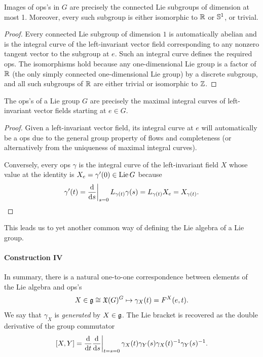 \begin{prop}
    Images of \gls{ops}'s in $G$ are precisely the connected Lie subgroups of dimension at most 1. Moreover, every such subgroup is either isomorphic to $\mathbb{R}$ or $\mathbb{S}^1$, or trivial.
\end{prop}
\begin{proof}
    Every connected Lie subgroup of dimension $1$ is automatically abelian and is the integral curve of the left-invariant vector field corresponding to any nonzero tangent vector to the subgroup at $e$. Such an integral curve defines the required \gls{ops}. The isomorphisms hold because any one-dimensional Lie group is a factor of $\mathbb{R}$ (the only simply connected one-dimensional Lie group) by a discrete subgroup, and all such subgroups of $\mathbb{R}$ are either trivial or isomorphic to $\mathbb{Z}$.
\end{proof}


\begin{thm}
    The \gls{ops}'s of a Lie group $G$ are precisely the maximal integral curves of left-invariant vector fields starting at $e\in G$.
\end{thm}
\begin{proof}
    Given a left-invariant vector field, its integral curve at $e$ will automatically be a \gls{ops} due to the general group property of flows and completeness (or alternatively from the uniqueness of maximal integral curves).

    Conversely, every \gls{ops} $\gamma$ is the integral curve of the left-invariant field $X$ whose value at the identity is $X_e=\gamma'(0)\in\operatorname{Lie} G$ because 
    \[\gamma'(t)=\restr{\frac{\dd}{\dd s}}{s=0}L_{\gamma(t)}\gamma(s)=L_{\gamma(t)}X_e=X_{\gamma(t)}.\]
\end{proof}

This leads us to yet another common way of defining the Lie algebra of a Lie group.

\paragraph{Construction IV} In summary, there is a natural one-to-one correspondence between elements of the Lie algebra and \gls{ops}'s
\[X\in \mathfrak{g}\cong \mathfrak{X}(G)^G\mapsto \gamma_X(t)=F^X(e,t).\]
We say that $\gamma_X$ is \emph{generated} by $X\in\mathfrak{g}$. The Lie bracket is recovered as the double derivative of the group commutator
\[[X,Y]=\restr{\frac{\dd}{\dd t}\frac{\dd}{\dd s}}{t=s=0}\gamma_X(t)\gamma_Y(s)\gamma_X(t)^{-1}\gamma_Y(s)^{-1}.\]

